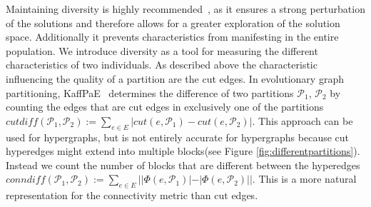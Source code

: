\documentclass[a4paper,12pt,titlepage, BCOR7mm,headsepline]{scrbook}
\numberwithin{equation}{section}
\begin{document}
Maintaining diversity is highly recommended~\cite{back1996evolutionary}, as it ensures a strong perturbation of the solutions and therefore allows for a greater exploration of the solution space.
Additionally it prevents characteristics from manifesting in the entire population.
We introduce diversity as a tool for measuring the different characteristics of two individuals. 
As described above the characteristic influencing the quality of a partition are the cut edges. In evolutionary graph partitioning, KaffPaE~\cite{sanders2012distributed} determines the difference of two partitions $\mathcal{P}_1$, $\mathcal{P}_2$ by counting the edges that are cut edges in exclusively one of the partitions $cutdiff(\mathcal{P}_1,\mathcal{P}_2) :=\sum_{e \in E} |cut(e,\mathcal{P}_1) - cut(e,\mathcal{P}_2)|$. This approach can be used for hypergraphs, but is not entirely accurate for hypergraphs because cut hyperedges might extend into multiple blocks(see Figure \ref{fig:differentpartitions}). Instead we count the number of blocks that are different between the hyperedges $conndiff(\mathcal{P}_1,\mathcal{P}_2) :=\sum_{e \in E} ||\Phi(e,\mathcal{P}_1)| - |\Phi(e,\mathcal{P}_2)||$. This is a more natural representation for the connectivity metric than cut edges.
\end{document}
